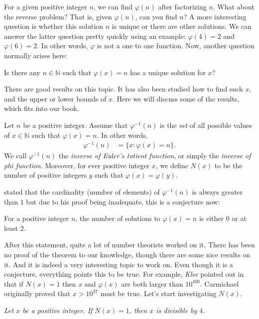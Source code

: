 \documentclass{subfile}
\begin{document}
	For a given positive integer $n$, we can find $\varphi(n)$ after factorizing $n$. What about the reverse problem? That is, given $\varphi(n)$, can you find $n$? A more interesting question is whether this solution $n$ is unique or there are other solutions. We can answer the latter question pretty quickly using an example: $\varphi(4)=2$ and $\varphi (6)=2$. In other words, $\varphi $ is not a one to one function. Now, another question normally arises here:
		\begin{problem}
			Is there any $n\in\mathbb{N}$ such that $\varphi(x)=n$ has a unique solution for $x$?
		\end{problem}
	There are good results on this topic. It has also been studied how to find such $x$, and the upper or lower bounds of $x$. Here we will discuss some of the results, which fits into our book.
		\begin{definition}
			Let $n$ be a positive integer. Assume that $\varphi ^{-1}(n)$ is the \textit{set} of all possible values of $x\in\mathbb{N} $ such that $\varphi (x)=n$. In other words,
				\begin{align*}
					\varphi^{-1}(n) & = \{x:\varphi(x)=n\}.
				\end{align*}
			We call $\varphi^{-1}(n)$ the \textit{inverse of Euler's totient function}, or simply the \textit{inverse of phi function}. Moreover, for ever positive integer $x$, we define $N(x)$ to be the number of positive integers $y$ such that $\varphi(x)=\varphi(y)$.
		\end{definition}
	
	\textcite{carmichael_1907} stated that the cardinality (number of elements) of $\varphi^{-1}(n)$ is always greater than $1$ but due to his proof being inadequate, this is a conjecture now:
		\begin{conjecture}
			For a positive integer $n$, the number of solutions to $\varphi(x)=n$ is either $0$ or at least $2$.
		\end{conjecture}
	After this statement, quite a lot of number theorists worked on it. There has been no proof of the theorem to our knowledge, though there are some nice results on it. And it is indeed a very interesting topic to work on. Even though it is a conjecture, everything points this to be true. For example, \textit{Klee} pointed out in \cite{jr._1947} that if $N(x)=1$ then $x$ and $\varphi(x)$ are both larger than $10^{400}$. Carmichael originally proved that $x>10^{37}$ must be true. Let's start investigating $N(x)$.
		\begin{theorem}\slshape
			Let $x$ be a positive integer. If $N(x)=1$, then $x$ is divisible by $4$.
		\end{theorem}
		
\end{document}
